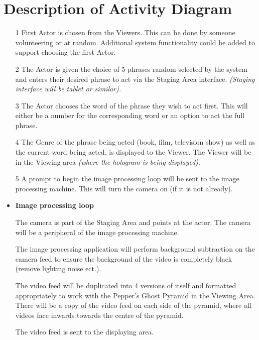 \documentclass{article}
\begin{document}
\section{Description of Activity Diagram}
\begin{itemize}
	\item [1] First Actor is chosen from the Viewers. This can be done by someone volunteering or at random. Additional system functionality could be added to support choosing the first Actor.
	
	\item [2] The Actor is given the choice of 5 phrases random selected by the system and enters their desired phrase to act via the Staging Area interface. \textit{(Staging interface will be tablet or similar).}
	
	\item [3] The Actor chooses the word of the phrase they wish to act first. This will either be a number for the corresponding word or an option to act the full phrase.
	
	\item [4] The Genre of the phrase being acted (book, film, television show) as well as the current word being acted, is displayed to the Viewer. The Viewer will be in the Viewing area \textit{(where the hologram is being displayed)}.
	
	\item [5] A prompt to begin the image processing loop will be sent to the image processing machine. This will turn the camera on (if it is not already).  
	
	\item \textbf{Image processing loop}

	\subitem [A1] The camera is part of the Staging Area and points at the actor. The camera will be a peripheral of the image processing machine.
	
	\subitem [A2] The image processing application will perform background subtraction on the camera feed to ensure the background of the video is completely black (remove lighting noise ect.).
	
	\subitem [A3] The video feed will be duplicated into 4 versions of itself and formatted appropriately to work with the Pepper's Ghost Pyramid in the Viewing Area. There will be a copy of the video feed on each side of the pyramid, where all videos face inwards towards the centre of the pyramid.
	
	\subitem [A4] The video feed is sent to the displaying area.
	

\end{itemize}
\end{document}
